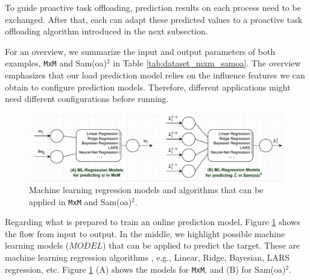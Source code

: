 To guide proactive task offloading, prediction results on each process need to be exchanged. After that, each can adapt these predicted values to a proactive task offloading algorithm introduced in the next subsection.\\

\begin{table}[b]
\caption{The input-output features for training a load prediction model in \texttt{MxM} and Sam(oa)$^2$.}
\centering
{}
\vspace{-1.0em}
\label{tab:dataset_mxm_samoa}
\end{table}

For an overview, we summarize the input and output parameters of both examples, \texttt{MxM} and Sam(oa)$^2$ in Table \ref{tab:dataset_mxm_samoa}. The overview emphasizes that our load prediction model relies on the influence features we can obtain to configure prediction models. Therefore, different applications might need different configurations before running.\\

\begin{figure}[t]
  \centering
  \includegraphics[scale=0.7]{./pictures/padlb_approach/padlb_ml_algorithms.pdf}
	\caption{Machine learning regression models and algorithms that can be applied in \texttt{MxM} and Sam(oa)$^2$.}
	\label{fig:ml_reg_algorithms}
\end{figure}

Regarding what is prepared to train an online prediction model, Figure \ref{fig:ml_reg_algorithms} shows the flow from input to output. In the middle, we highlight possible machine learning models ($MODEL$) that can be applied to predict the target. These are machine learning regression algorithms \cite{james2013introml}, e.g., Linear, Ridge, Bayesian, LARS regression, etc. Figure \ref{fig:ml_reg_algorithms} (A) shows the models for \texttt{MxM}, and (B) for Sam(oa)$^2$. \\

